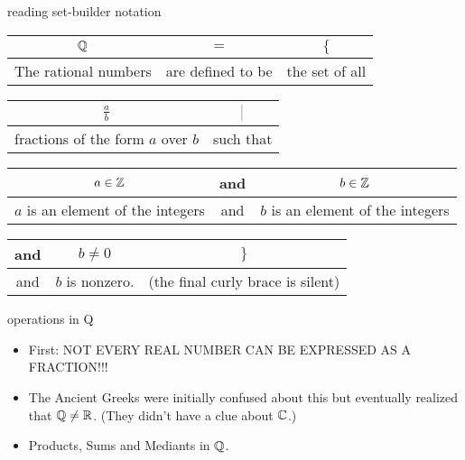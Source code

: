 \documentclass[landscape]{beamer}
\begin{document}
\begin{frame}{reading set-builder notation}

\vspace{.1in}

\begin{tabular}{c|c|c}
\rule[-10pt]{0pt}{22pt} ${\mathbb Q}$ & $=$ & $\{$  \\ \hline
\rule[-6pt]{0pt}{22pt} The rational numbers & are defined to be & the set of all\\
\end{tabular}

\vspace{.1in}

\begin{tabular}{c|c}
\rule[-10pt]{0pt}{22pt} $\displaystyle \frac{a}{b}$ & $\suchthat$ \\ \hline
\rule[-6pt]{0pt}{22pt} fractions of the form $a$ over $b$ & such that \\
\end{tabular}

\vspace{.1in}

\begin{tabular}{c|c|c}
\rule[-10pt]{0pt}{22pt} $a \in {\mathbb Z}$ & and & $b \in {\mathbb Z}$ \\ \hline
\rule[-6pt]{0pt}{22pt} $a$ is an element of the integers & and & $b$ is an
element of the integers \\
\end{tabular}

\vspace{.1in}

\begin{tabular}{c|c|c}
\rule[-10pt]{0pt}{22pt} and & $b \neq 0$ & $\}$ \\ \hline
\rule[-6pt]{0pt}{22pt} and & $b$ is nonzero. & (the final curly brace
is silent) \\
\end{tabular}

\end{frame}


\begin{frame}{operations in Q}
\begin{itemize}
\item First: NOT EVERY REAL NUMBER CAN BE EXPRESSED AS A FRACTION!!! \pause
\item The Ancient Greeks were initially confused about this but eventually realized that ${\mathbb Q} \neq {\mathbb R}$.  (They didn't have a clue about ${\mathbb C}$.)
\item Products, Sums and Mediants in ${\mathbb Q}$.
\end{itemize}
\end{frame}
\end{document}
